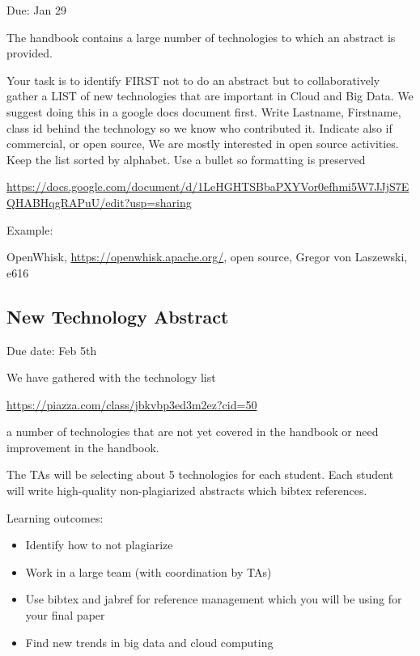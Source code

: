 \begin{exercise} \label{E:new-tech}
Due: Jan 29

The handbook contains a large number of technologies to which an
abstract is provided.

Your task is to identify FIRST not to do an abstract but to
collaboratively gather a LIST of new technologies that are important
in Cloud and Big Data. We suggest doing this in a google docs document
first. Write Lastname, Firstname, class id behind the technology so we
know who contributed it. Indicate also if commercial, or open source,
We are mostly interested in open source activities. Keep the list
sorted by alphabet. Use a bullet so formatting is preserved

\url{https://docs.google.com/document/d/1LeHGHTSBbaPXYVor0efhmi5W7JJjS7EQHABHqgRAPuU/edit?usp=sharing}

Example: 

OpenWhisk, \url{https://openwhisk.apache.org/}, open source, Gregor von Laszewski, e616

\end{exercise}




\subsection{New Technology Abstract}

\begin{exercise} \label{E:new-tech-abstract}
 
Due date: Feb 5th

We have gathered with the technology list 

\url{https://piazza.com/class/jbkvbp3ed3m2ez?cid=50}

a number of technologies that are not yet covered in the handbook or
need improvement in the handbook.

The TAs will be selecting about 5 technologies for each student. Each
student will write high-quality non-plagiarized abstracts which bibtex
references.
 
Learning outcomes:

\begin{itemize}

\item Identify how to not plagiarize
\item Work in a large team (with coordination by TAs)
\item Use bibtex and jabref for reference management which you will be using for your final paper
\item Find new trends in big data and cloud computing

\end{itemize}

\end{exercise}
